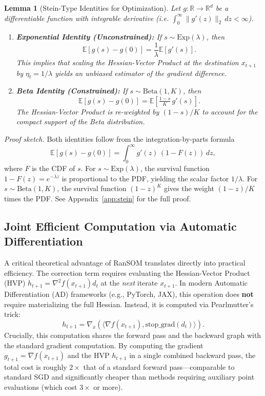 \documentclass{article}
\theoremstyle{plain}
\newtheorem{lemma}[theorem]{Lemma}
\theoremstyle{definition}
\theoremstyle{remark}
\begin{document}
\begin{lemma}[Stein-Type Identities for Optimization]
\label{lemma:stein}
Let $g: \mathbb{R} \to \mathbb{R}^d$ be a differentiable function with
\emph{integrable derivative} (i.e. $\int_0^\infty \|g'(z)\|_2\, dz <
\infty$).
\begin{enumerate}
    \item \textbf{Exponential Identity (Unconstrained):} If
    $s \sim \mathrm{Exp}(\lambda)$, then
    \begin{equation}
        \mathbb{E}[g(s) - g(0)] = \frac{1}{\lambda} \mathbb{E}[g'(s)].
    \end{equation}
    This implies that scaling the Hessian-Vector Product at the
    destination $x_{t+1}$ by $\eta_t = 1/\lambda$ yields an unbiased
    estimator of the gradient difference.
 
    \item \textbf{Beta Identity (Constrained):} If
    $s \sim \mathrm{Beta}(1, K)$, then
    \begin{equation}
        \mathbb{E}[g(s) - g(0)]
        = \mathbb{E}\!\left[\tfrac{1-s}{K}\, g'(s)\right].
    \end{equation}
    The Hessian-Vector Product is re-weighted by $(1-s)/K$ to account
    for the compact support of the Beta distribution.
\end{enumerate}
\end{lemma}
 
\textit{Proof sketch.} Both identities follow from the integration-by-parts
formula
\[
    \mathbb{E}[g(s)-g(0)] = \int_0^\infty g'(z)\,(1 - F(z))\, dz,
\]
where $F$ is the CDF of $s$. For $s \sim \mathrm{Exp}(\lambda)$, the
survival function $1-F(z) = e^{-\lambda z}$ is proportional to the PDF,
yielding the scalar factor $1/\lambda$. For $s \sim \mathrm{Beta}(1, K)$,
the survival function $(1-z)^K$ gives the weight $(1-z)/K$ times the
PDF. See Appendix~\ref{app:stein} for the full proof.


\subsection{Joint Efficient Computation via Automatic Differentiation}
A critical theoretical advantage of RanSOM translates directly into practical efficiency. The correction term requires evaluating the Hessian-Vector Product (HVP) $h_{t+1} = \nabla^2 f(x_{t+1}) d_t$ at the \textit{next} iterate $x_{t+1}$.
In modern Automatic Differentiation (AD) frameworks (e.g., PyTorch, JAX), this operation does \textbf{not} require materializing the full Hessian. Instead, it is computed via Pearlmutter's trick:
\begin{equation}
    h_{t+1} = \nabla_{x} (\langle \nabla f(x_{t+1}), \text{stop\_grad}(d_t) \rangle).
\end{equation}
Crucially, this computation shares the forward pass and the backward graph with the standard gradient computation. By computing the gradient $g_{t+1} = \nabla f(x_{t+1})$ and the HVP $h_{t+1}$ in a single combined backward pass, the total cost is roughly $2\times$ that of a standard forward pass—comparable to standard SGD and significantly cheaper than methods requiring auxiliary point evaluations (which cost $3\times$ or more).
\end{document}
